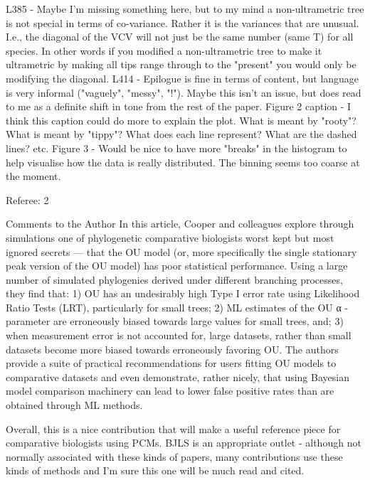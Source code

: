 \documentclass[11pt]{letter}
\begin{document}
\begin{letter}{}
L385 - Maybe I'm missing something here, but to my mind a non-ultrametric tree is not special in terms of co-variance. Rather it is the variances that are unusual. I.e., the diagonal of the VCV will not just be the same number (same T) for all species. In other words if you modified a non-ultrametric tree to make it ultrametric by making all tips range through to the "present" you would only be modifying the diagonal.
L414 - Epilogue is fine in terms of content, but language is very informal ("vaguely", "messy", "!"). Maybe this isn't an issue, but does read to me as a definite shift in tone from the rest of the paper.
Figure 2 caption - I think this caption could do more to explain the plot. What is meant by "rooty"? What is meant by "tippy"? What does each line represent? What are the dashed lines? etc.
Figure 3 - Would be nice to have more "breaks" in the histogram to help visualise how the data is really distributed. The binning seems too coarse at the moment.

Referee: 2

Comments to the Author
In this article, Cooper and colleagues explore through simulations one of phylogenetic comparative biologists worst kept but most ignored secrets — that the OU model (or, more specifically the single stationary peak version of the OU model) has poor statistical performance. Using a large number of simulated phylogenies derived under different branching processes, they find that: 1) OU has an undesirably high Type I error rate using Likelihood Ratio Tests (LRT), particularly for small trees; 2) ML estimates of the OU α - parameter are erroneously biased towards large values for small trees, and; 3) when measurement error is not accounted for, large datasets, rather than small datasets become more biased towards erroneously favoring OU. The authors provide a suite of practical recommendations for users fitting OU models to comparative datasets and even demonstrate, rather nicely, that using Bayesian model comparison machinery can lead to lower false positive rates than are obtained through ML methods.

Overall, this is a nice contribution that will make a useful reference piece for comparative biologists using PCMs. BJLS is an appropriate outlet - although not normally associated with these kinds of papers, many contributions use these kinds of methods and I’m sure this one will be much read and cited.


\end{letter}
\end{document}
